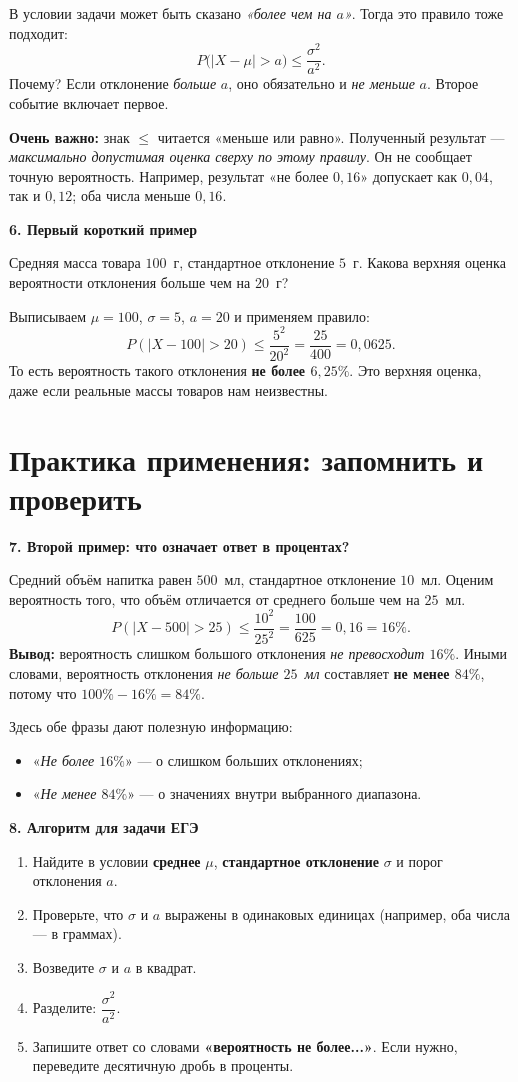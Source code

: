 \documentclass[a4paper,12pt]{article}
\newcommand{\lab}[1]{\par\noindent\textbf{#1}\par\vspace{-4pt}}
\begin{document}
В условии задачи может быть сказано \emph{«более чем на $a$»}.
Тогда это правило тоже подходит:
\[
\boxed{\displaystyle
P\bigl(|X-\mu|>a\bigr)\le \frac{\sigma^2}{a^2}.}
\]
Почему? Если отклонение \emph{больше} $a$, оно обязательно и
\emph{не меньше} $a$. Второе событие включает первое.

\textbf{Очень важно:} знак $\le$ читается «меньше или равно».
Полученный результат --- \emph{максимально допустимая оценка сверху
по этому правилу}. Он не сообщает точную вероятность.
Например, результат «не более $0{,}16$» допускает как $0{,}04$,
так и $0{,}12$; оба числа меньше $0{,}16$.

\lab{6. Первый короткий пример}
Средняя масса товара $100$~г, стандартное отклонение $5$~г.
Какова верхняя оценка вероятности отклонения больше чем на $20$~г?

Выписываем $\mu=100$, $\sigma=5$, $a=20$ и применяем правило:
\[
P(|X-100|>20)\le\frac{5^2}{20^2}
=\frac{25}{400}=0{,}0625.
\]
То есть вероятность такого отклонения \textbf{не более $6{,}25\%$}.
Это верхняя оценка, даже если реальные массы товаров нам неизвестны.

\newpage
\section*{Практика применения: запомнить и проверить}
\lab{7. Второй пример: что означает ответ в процентах?}
Средний объём напитка равен $500$~мл, стандартное отклонение
$10$~мл. Оценим вероятность того, что объём отличается от
среднего больше чем на $25$~мл.
\[
P(|X-500|>25)\le\frac{10^2}{25^2}
=\frac{100}{625}=0{,}16=16\%.
\]
\textbf{Вывод:} вероятность слишком большого отклонения
\emph{не превосходит $16\%$}. Иными словами, вероятность
отклонения \emph{не больше $25$~мл} составляет \textbf{не менее $84\%$},
потому что $100\%-16\%=84\%$.

Здесь обе фразы дают полезную информацию:
\begin{itemize}
 \item «\emph{Не более $16\%$}» --- о слишком больших отклонениях;
 \item «\emph{Не менее $84\%$}» --- о значениях внутри выбранного диапазона.
\end{itemize}

\lab{8. Алгоритм для задачи ЕГЭ}
\begin{enumerate}[label=\arabic*.]
 \item Найдите в условии \textbf{среднее} $\mu$, \textbf{стандартное отклонение}
 $\sigma$ и порог отклонения $a$.
 \item Проверьте, что $\sigma$ и $a$ выражены в одинаковых единицах
 (например, оба числа --- в граммах).
 \item Возведите $\sigma$ и $a$ в квадрат.
 \item Разделите: $\dfrac{\sigma^2}{a^2}$.
 \item Запишите ответ со словами \textbf{«вероятность не более...»}.
 Если нужно, переведите десятичную дробь в проценты.
\end{enumerate}
\end{document}

